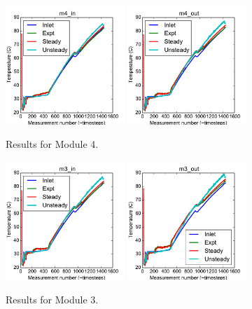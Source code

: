 \documentclass{article}
\begin{document}
\clearpage
\begin{figure}[!ht]
\centering
\includegraphics[width=0.4\textwidth]{../../data/ICSolar/images/Feb28_m4_in_compare.pdf}\hspace{0.05\textwidth}
\includegraphics[width=0.4\textwidth]{../../data/ICSolar/images/Feb28_m4_out_compare.pdf}\hspace{0.05\textwidth}\\
\caption{Results for Module 4.}\end{figure}
\begin{figure}[!ht]
\centering
\includegraphics[width=0.4\textwidth]{../../data/ICSolar/images/Feb28_m3_in_compare.pdf}\hspace{0.05\textwidth}
\includegraphics[width=0.4\textwidth]{../../data/ICSolar/images/Feb28_m3_out_compare.pdf}\hspace{0.05\textwidth}\\
\caption{Results for Module 3.}\end{figure}
\end{document}
